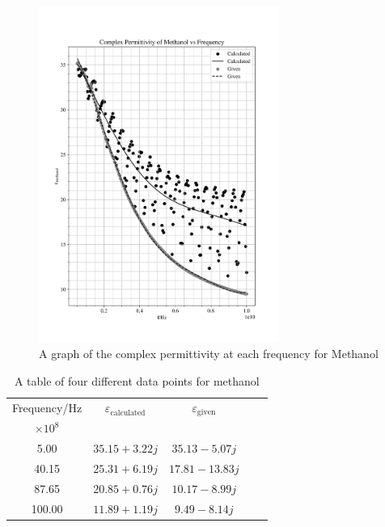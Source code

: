 \documentclass[12pt, a4paper]{article}
\begin{document}
\begin{figure}[H]
    \centering
    \includegraphics[width = 0.7\textwidth]{Plot1.png}\caption{A graph of the complex permittivity at each frequency for Methanol}\label{fig: Methanol Graph}
\end{figure}

\begin{table}[H]
    \centering
    \begin{tabular}{ccccc}
    \hline
    Frequency/Hz &
      \(\varepsilon_{\mathrm{calculated}}\) &
      \(\varepsilon_{\mathrm{given}}\) \\
      \(\times 10^8\)& & \\ \hline \hline
      5.00   & \(35.15+3.22j\)  & \(35.13-5.07j\)  \\
      40.15  & \(25.31+6.19j\)  & \(17.81-13.83j\) \\
      87.65  & \(20.85+0.76j\)  & \(10.17-8.99j\)  \\
      100.00 & \(11.89+1.19j\)  & \(9.49-8.14j\)   \\
      \hline
    \end{tabular}
    \caption{A table of four different data points for methanol}\label{tab: Table 1}
\end{table}
\end{document}
